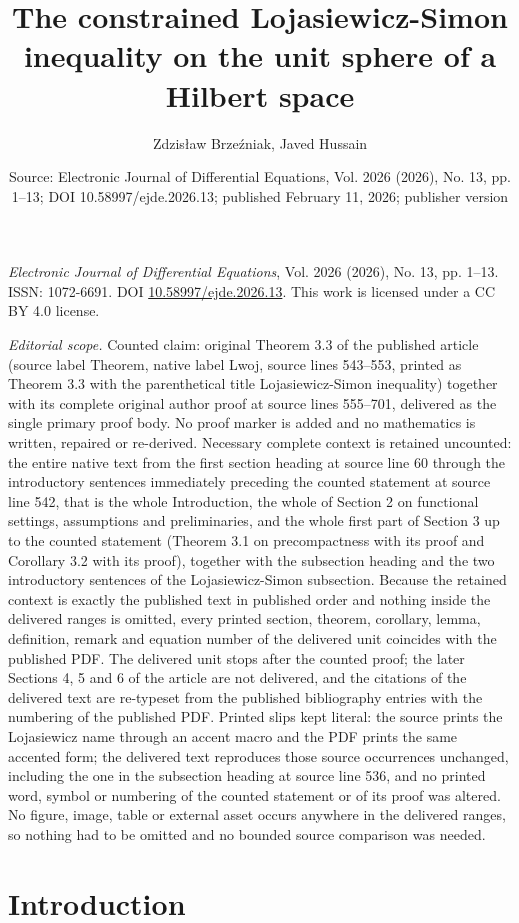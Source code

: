 \documentclass[10pt,a4paper]{amsart}
\title[The constrained Lojasiewicz-Simon inequality on the unit sphere of a]{The constrained Lojasiewicz-Simon inequality on the unit sphere of a Hilbert space}
\author{Zdzis\l{a}w Brze\'zniak, Javed Hussain}
\date{Source: Electronic Journal of Differential Equations, Vol. 2026 (2026), No. 13, pp. 1--13; DOI 10.58997/ejde.2026.13; published February 11, 2026; publisher version}
\numberwithin{equation}{section}
\begin{document}
\maketitle
\noindent\emph{Electronic Journal of Differential Equations}, Vol. 2026 (2026), No. 13, pp. 1--13.\newline
ISSN: 1072-6691. DOI \href{https://doi.org/10.58997/ejde.2026.13}{10.58997/ejde.2026.13}. This work is licensed under a CC BY 4.0 license.\par\smallskip
\noindent\textit{Editorial scope.} Counted claim: original Theorem 3.3 of the published article (source label Theorem, native label Lwoj, source lines 543--553, printed as Theorem 3.3 with the parenthetical title Lojasiewicz-Simon inequality) together with its complete original author proof at source lines 555--701, delivered as the single primary proof body. No proof marker is added and no mathematics is written, repaired or re-derived. Necessary complete context is retained uncounted: the entire native text from the first section heading at source line 60 through the introductory sentences immediately preceding the counted statement at source line 542, that is the whole Introduction, the whole of Section 2 on functional settings, assumptions and preliminaries, and the whole first part of Section 3 up to the counted statement (Theorem 3.1 on precompactness with its proof and Corollary 3.2 with its proof), together with the subsection heading and the two introductory sentences of the Lojasiewicz-Simon subsection. Because the retained context is exactly the published text in published order and nothing inside the delivered ranges is omitted, every printed section, theorem, corollary, lemma, definition, remark and equation number of the delivered unit coincides with the published PDF. The delivered unit stops after the counted proof; the later Sections 4, 5 and 6 of the article are not delivered, and the citations of the delivered text are re-typeset from the published bibliography entries with the numbering of the published PDF. Printed slips kept literal: the source prints the Lojasiewicz name through an accent macro and the PDF prints the same accented form; the delivered text reproduces those source occurrences unchanged, including the one in the subsection heading at source line 536, and no printed word, symbol or numbering of the counted statement or of its proof was altered. No figure, image, table or external asset occurs anywhere in the delivered ranges, so nothing had to be omitted and no bounded source comparison was needed.
\section{Introduction}\label{sec-Introduction}
\end{document}
